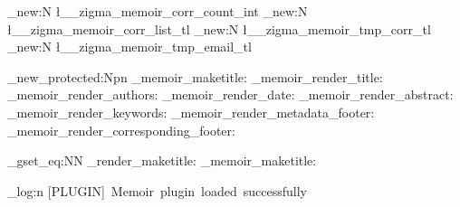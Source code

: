 \int_new:N \l__zigma_memoir_corr_count_int
\tl_new:N \l__zigma_memoir_corr_list_tl
\tl_new:N \l__zigma_memoir_tmp_corr_tl
\tl_new:N \l__zigma_memoir_tmp_email_tl


\cs_new_protected:Npn \zigma_memoir_maketitle:
  {
    \zigma_memoir_render_title:
    \zigma_memoir_render_authors:
    \zigma_memoir_render_date:
    \zigma_memoir_render_abstract:
    \zigma_memoir_render_keywords:
    \zigma_memoir_render_metadata_footer:
    \zigma_memoir_render_corresponding_footer:
  }

\cs_gset_eq:NN \zigma_render_maketitle: \zigma_memoir_maketitle:

\zigma_log:n { [PLUGIN]~Memoir~plugin~loaded~successfully }

\ExplSyntaxOff

\endinput
